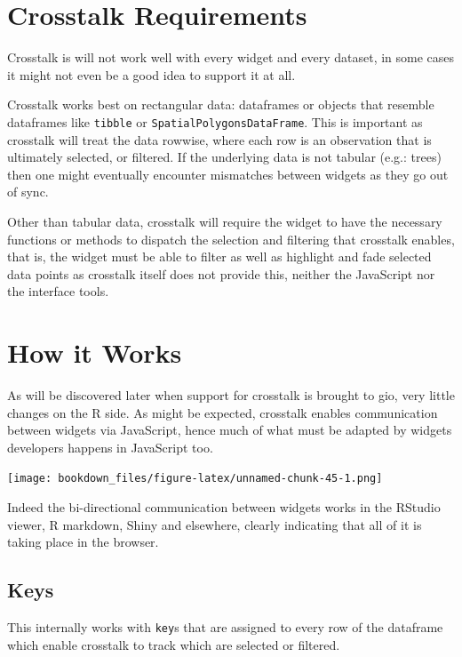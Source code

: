 \documentclass[
]{krantz}
\begin{document}
\hypertarget{linking-widgets-req}{%
\section{Crosstalk Requirements}\label{linking-widgets-req}}

Crosstalk is will not work well with every widget and every dataset, in some cases it might not even be a good idea to support it at all.

Crosstalk works best on rectangular data: dataframes or objects that resemble dataframes like \texttt{tibble} or \texttt{SpatialPolygonsDataFrame}. This is important as crosstalk will treat the data rowwise, where each row is an observation that is ultimately selected, or filtered. If the underlying data is not tabular (e.g.: trees) then one might eventually encounter mismatches between widgets as they go out of sync.

Other than tabular data, crosstalk will require the widget to have the necessary functions or methods to dispatch the selection and filtering that crosstalk enables, that is, the widget must be able to filter as well as highlight and fade selected data points as crosstalk itself does not provide this, neither the JavaScript nor the interface tools.

\hypertarget{linking-widgets-inner-workings}{%
\section{How it Works}\label{linking-widgets-inner-workings}}

As will be discovered later when support for crosstalk is brought to gio, very little changes on the R side. As might be expected, crosstalk enables communication between widgets via JavaScript, hence much of what must be adapted by widgets developers happens in JavaScript too.

\texttt{[image: bookdown\_files/figure-latex/unnamed-chunk-45-1.png]}

Indeed the bi-directional communication between widgets works in the RStudio viewer, R markdown, Shiny and elsewhere, clearly indicating that all of it is taking place in the browser.

\hypertarget{linking-widgets-keys}{%
\subsection{Keys}\label{linking-widgets-keys}}

This internally works with \texttt{key}s that are assigned to every row of the dataframe which enable crosstalk to track which are selected or filtered.
\end{document}

